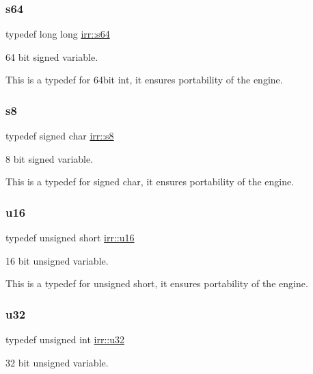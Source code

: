 \subsubsection{\texorpdfstring{s64}{s64}}
{\footnotesize\ttfamily typedef long long \hyperlink{namespaceirr_abf54bd535f8d4dd996270e68c3ad8c08}{irr\+::s64}}



64 bit signed variable. 

This is a typedef for 64bit int, it ensures portability of the engine. \mbox{\label{namespaceirr_adc3ec66d7537550be0fea1c9eeadd63d}} 
\subsubsection{\texorpdfstring{s8}{s8}}
{\footnotesize\ttfamily typedef signed char \hyperlink{namespaceirr_adc3ec66d7537550be0fea1c9eeadd63d}{irr\+::s8}}



8 bit signed variable. 

This is a typedef for signed char, it ensures portability of the engine. \mbox{\label{namespaceirr_ae9f8ec82692ad3b83c21f555bfa70bcc}} 
\subsubsection{\texorpdfstring{u16}{u16}}
{\footnotesize\ttfamily typedef unsigned short \hyperlink{namespaceirr_ae9f8ec82692ad3b83c21f555bfa70bcc}{irr\+::u16}}



16 bit unsigned variable. 

This is a typedef for unsigned short, it ensures portability of the engine. \mbox{\label{namespaceirr_a0416a53257075833e7002efd0a18e804}} 
\subsubsection{\texorpdfstring{u32}{u32}}
{\footnotesize\ttfamily typedef unsigned int \hyperlink{namespaceirr_a0416a53257075833e7002efd0a18e804}{irr\+::u32}}



32 bit unsigned variable. 

